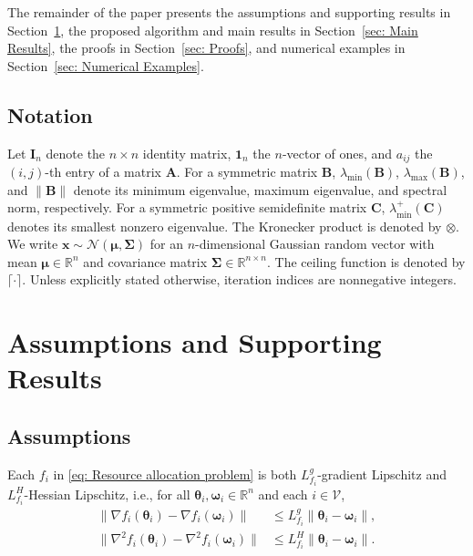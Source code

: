 \documentclass{siamart251216}
\begin{document}
The remainder of the paper presents the assumptions and supporting results in Section~\ref{sec: Assumptions and Supporting Results}, the proposed algorithm and main results in Section~\ref{sec: Main Results}, the proofs in Section~\ref{sec: Proofs}, and numerical examples in Section~\ref{sec: Numerical Examples}.

\subsection{Notation}
\label{sec: Notation}
Let $\mathbf{I}_n$ denote the $n\times n$ identity matrix, $\bm{1}_n$ the $n$-vector of ones, and $a_{ij}$ the $(i,j)$-th entry of a matrix $\mathbf{A}$. For a symmetric matrix $\mathbf{B}$, $\lambda_{\min}(\mathbf{B})$, $\lambda_{\max}(\mathbf{B})$, and $\|\mathbf{B}\|$ denote its minimum eigenvalue, maximum eigenvalue, and spectral norm, respectively. For a symmetric positive semidefinite matrix $\mathbf{C}$, $\lambda_{\min}^{+}(\mathbf{C})$ denotes its smallest nonzero eigenvalue. The Kronecker product is denoted by $\otimes$. We write $\mathbf{x}\sim\mathcal{N}(\bm{\mu},\bm{\Sigma})$ for an $n$-dimensional Gaussian random vector with mean $\bm{\mu}\in\mathbb{R}^{n}$ and covariance matrix $\bm{\Sigma}\in\mathbb{R}^{n\times n}$. The ceiling function is denoted by $\lceil\cdot\rceil$. Unless explicitly stated otherwise, iteration indices are nonnegative integers.%

\section{Assumptions and Supporting Results}
\label{sec: Assumptions and Supporting Results}
\subsection{Assumptions}
\begin{assumption}
\label{ass: Lipschitz}
    Each $f_{i}$ in \eqref{eq: Resource allocation problem} is both $L_{f_{i}}^{g}$-gradient Lipschitz and $L_{f_{i}}^{H}$-Hessian Lipschitz, i.e., for all $\boldsymbol{\theta}_{i},\boldsymbol{\omega}_{i}\in\mathbb{R}^{n}$ and each $i \in \mathcal{V}$,
    \begin{align*}
        \|\nabla f_{i}(\boldsymbol{\theta}_{i}) - \nabla f_{i}(\boldsymbol{\omega}_{i})\|
        &\le L_{f_{i}}^{g} \|\boldsymbol{\theta}_{i}-\boldsymbol{\omega}_{i}\|,\\
        \|\nabla^{2} f_{i}(\boldsymbol{\theta}_{i}) - \nabla^{2} f_{i}(\boldsymbol{\omega}_{i})\|
        &\le L_{f_{i}}^{H} \|\boldsymbol{\theta}_{i}-\boldsymbol{\omega}_{i}\|.
    \end{align*}
\end{assumption}
\end{document}
